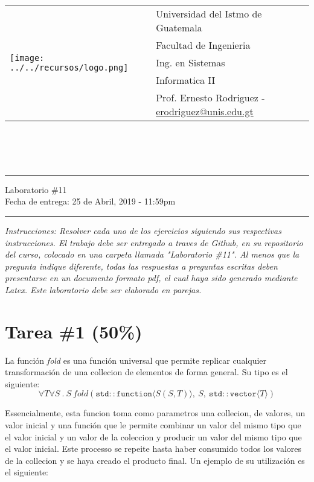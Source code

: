 \documentclass{article}
\newcommand{\horrule}[1]{\rule{\linewidth}{#1}}
\begin{document}
\begin{tabular}{l l}
\multirow{5}{*}{\texttt{[image: ../../recursos/logo.png]}} & Universidad del Istmo de Guatemala \\
 & Facultad de Ingenieria \\
 & Ing. en Sistemas \\
 & Informatica II \\
 & Prof. Ernesto Rodriguez - \href{mailto:erodriguez@unis.edu.gt}{erodriguez@unis.edu.gt} \\
\end{tabular}
\\\\\\

\begin{center}
        \horrule{0.5pt}
        \huge{Laboratorio \#11} \\
        \large{Fecha de entrega: 25 de Abril, 2019 - 11:59pm} \\
        \horrule{1pt}
\end{center}

\emph{Instrucciones: Resolver cada uno de los ejercicios siguiendo sus respectivas
instrucciones. El trabajo debe ser entregado a traves de Github, en su repositorio del curso, colocado en una carpeta llamada "Laboratorio \#11".
Al menos que la pregunta indique diferente, todas las respuestas a preguntas escritas deben presentarse en
un documento formato pdf, el cual haya sido generado mediante Latex. Este laboratorio
debe ser elaborado en parejas.}

\section*{Tarea \#1 (50\%)}

La funci\'on \emph{fold} es una funci\'on universal que permite replicar
cualquier transformaci\'on de una collecion de elementos de forma general.
Su tipo es el siguiente:
\[
        \forall T\forall S\ .\ S\ fold(\mathtt{std::function}\langle S(S,T)\rangle,\ S,\ \mathtt{std::vector}\langle T\rangle) 
\]

Essencialmente, esta funcion toma como parametros una collecion, de valores, un valor inicial
y una funci\'on que le permite combinar un valor del mismo tipo que el valor inicial y un
valor de la coleccion y producir un valor del mismo tipo que el valor inicial. Este processo
se repeite hasta haber consumido todos los valores de la collecion y se haya creado el producto
final. Un ejemplo de su utilizaci\'on es el siguiente:
\end{document}
